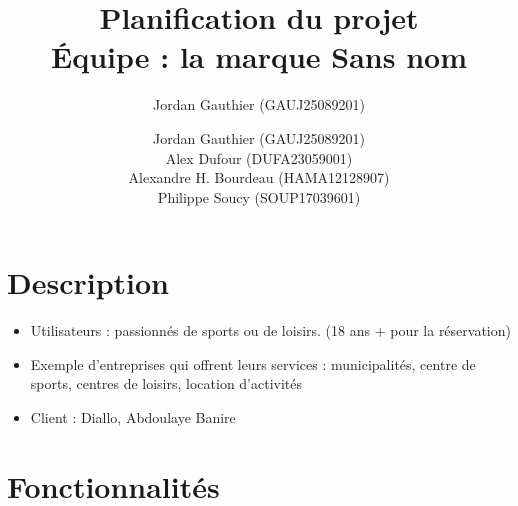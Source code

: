 \documentclass[letter,12pt]{exam}
\author{Jordan Gauthier (GAUJ25089201)}
\author{Jordan Gauthier (GAUJ25089201)\\
Alex Dufour (DUFA23059001)\\
Alexandre H. Bourdeau (HAMA12128907)\\
Philippe Soucy (SOUP17039601)}
\title{Planification du projet\\
Équipe : la marque Sans nom}
\date{}
\begin{document}
\maketitle

\section{Description}\label{description}

\begin{itemize}

\item Utilisateurs : passionnés de sports ou de loisirs. (18 ans + pour la
réservation)
\item Exemple d'entreprises qui offrent leurs services : municipalités, centre de sports, centres de loisirs, location d'activités

\item Client : Diallo, Abdoulaye Banire

\end{itemize}

\section{Fonctionnalités}\label{fonctionnalites}
\end{document}
